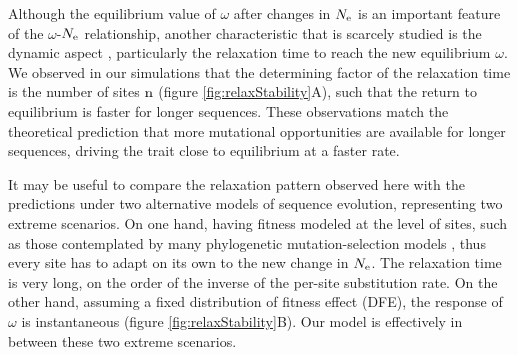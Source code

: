Although the equilibrium value of $\omega$ after changes in $N_{\mathrm{e}}$ is an important feature of the $\omega$-$N_{\mathrm{e}}$ relationship, another characteristic that is scarcely studied is the dynamic aspect \citep{Jones2016}, particularly the relaxation time to reach the new equilibrium $\omega$.
We observed in our simulations that the determining factor of the relaxation time is the number of sites $\text{n}$ (figure \ref{fig:relaxStability}A), such that the return to equilibrium is faster for longer sequences.
These observations match the theoretical prediction that more mutational opportunities are available for longer sequences, driving the trait close to equilibrium at a faster rate.

It may be useful to compare the relaxation pattern observed here with the predictions under two alternative models of sequence evolution, representing two extreme scenarios.
On one hand, having fitness modeled at the level of sites, such as those contemplated by many phylogenetic mutation-selection models \citep{Halpern1998, Rodrigue2010, Tamuri2012}, thus every site has to adapt on its own to the new change in $N_{\mathrm{e}}$.
The relaxation time is very long, on the order of the inverse of the per-site \gls{substitution} rate.
On the other hand, assuming a fixed distribution of fitness effect (\acrshort{DFE}), the response of $\omega$ is instantaneous (figure \ref{fig:relaxStability}B).
Our model is effectively in between these two extreme scenarios.

